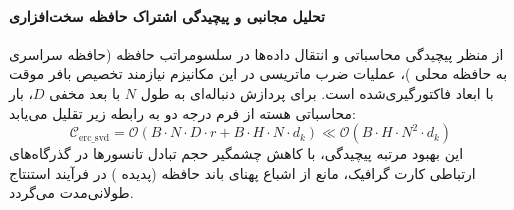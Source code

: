 \paragraph{تحلیل مجانبی و پیچیدگی اشتراک حافظه سخت‌افزاری}
از منظر پیچیدگی محاسباتی و انتقال داده‌ها در سلسومراتب حافظه (حافظه سراسری  به حافظه محلی )، عملیات ضرب ماتریسی در این مکانیزم نیازمند تخصیص بافر موقت با ابعاد فاکتورگیری‌شده است. برای پردازش دنباله‌ای به طول $N$ با بعد مخفی $D$، بار محاسباتی هسته از فرم درجه دو به رابطه زیر تقلیل می‌یابد:
\begin{equation}
\label{eq:complexity_erc_svd}
\mathcal{C}_{\text{erc\_svd}} = \mathcal{O}\left( B \cdot N \cdot D \cdot r + B \cdot H \cdot N \cdot d_k \right) \ll \mathcal{O}\left( B \cdot H \cdot N^2 \cdot d_k \right)
\end{equation}
این بهبود مرتبه پیچیدگی، با کاهش چشمگیر حجم تبادل تانسورها در گذرگاه‌های ارتباطی کارت گرافیک، مانع از اشباع پهنای باند حافظه (پدیده ) در فرآیند استنتاج طولانی‌مدت می‌گردد.
